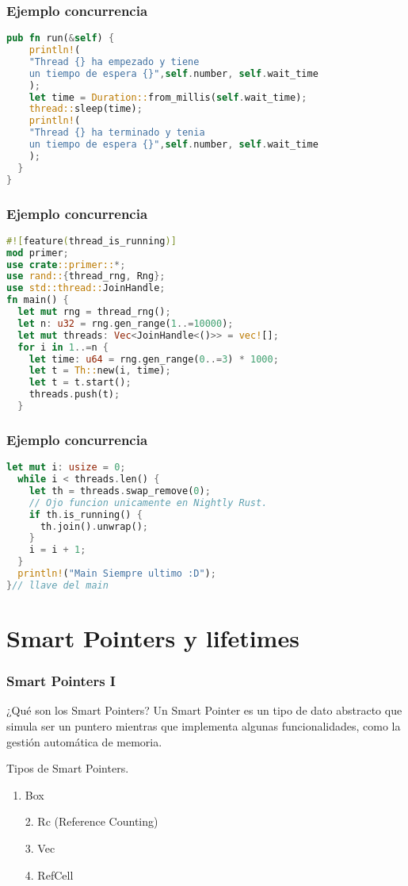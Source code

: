 \documentclass{beamer}
\begin{document}
\begin{frame}[fragile]
  \frametitle{Ejemplo concurrencia}
  \begin{lstlisting}[language=Rust , style=boxed ]
  pub fn run(&self) {
    println!(
    "Thread {} ha empezado y tiene 
    un tiempo de espera {}",self.number, self.wait_time
    );
    let time = Duration::from_millis(self.wait_time);
    thread::sleep(time);
    println!(
    "Thread {} ha terminado y tenia 
    un tiempo de espera {}",self.number, self.wait_time
    );
  }
}\end{lstlisting}
\end{frame}

\begin{frame}[fragile]
  \frametitle{Ejemplo concurrencia}
  \begin{lstlisting}[language=Rust, style=boxed ]
#![feature(thread_is_running)]
mod primer;
use crate::primer::*;
use rand::{thread_rng, Rng};
use std::thread::JoinHandle;
fn main() {
  let mut rng = thread_rng();
  let n: u32 = rng.gen_range(1..=10000);
  let mut threads: Vec<JoinHandle<()>> = vec![];
  for i in 1..=n {
    let time: u64 = rng.gen_range(0..=3) * 1000;
    let t = Th::new(i, time);
    let t = t.start();
    threads.push(t);
  }
\end{lstlisting}
\end{frame}

\begin{frame}[fragile]
  \frametitle{Ejemplo concurrencia}
  \begin{lstlisting}[language=Rust, style=boxed ]
  let mut i: usize = 0;
  while i < threads.len() {
    let th = threads.swap_remove(0);
    // Ojo funcion unicamente en Nightly Rust.
    if th.is_running() {
      th.join().unwrap();
    }
    i = i + 1;
  }
  println!("Main Siempre ultimo :D");
}// llave del main\end{lstlisting}
\end{frame}

\section{Smart Pointers y lifetimes}
\begin{frame}
  \frametitle{Smart Pointers I}
  \begin{block}{¿Qué son los Smart Pointers?}
    Un Smart Pointer es un tipo de dato abstracto que simula ser un puntero mientras que implementa algunas funcionalidades, como la gestión automática de memoria.
  \end{block}
  \pause
  \bigbreak
  Tipos de Smart Pointers.
  \begin{enumerate}[1.]
    \item Box
    \pause
    \item [2.] Rc (Reference Counting)
    \pause
    \item [3.] Vec 
    \pause
    \item [4.] RefCell
  \end{enumerate}
\end{frame}
\end{document}
